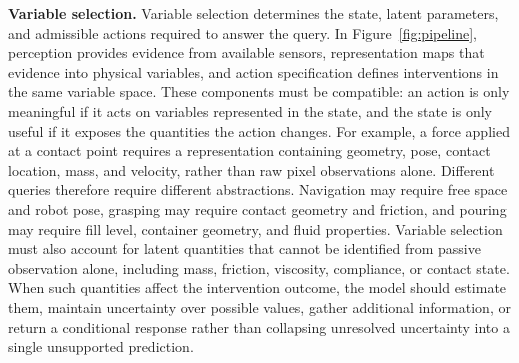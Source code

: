 \documentclass{article}
\begin{document}
\textbf{Variable selection.} 
Variable selection determines the state, latent parameters, and admissible actions required to answer the query. In Figure~\ref{fig:pipeline}, perception provides evidence from available sensors, representation maps that evidence into physical variables, and action specification defines interventions in the same variable space. These components must be compatible: an action is only meaningful if it acts on variables represented in the state, and the state is only useful if it exposes the quantities the action changes. For example, a force applied at a contact point requires a representation containing geometry, pose, contact location, mass, and velocity, rather than raw pixel observations alone. Different queries therefore require different abstractions. Navigation may require free space and robot pose, grasping may require contact geometry and friction, and pouring may require fill level, container geometry, and fluid properties. Variable selection must also account for latent quantities that cannot be identified from passive observation alone, including mass, friction, viscosity, compliance, or contact state. When such quantities affect the intervention outcome, the model should estimate them, maintain uncertainty over possible values, gather additional information, or return a conditional response rather than collapsing unresolved uncertainty into a single unsupported prediction.
\end{document}
